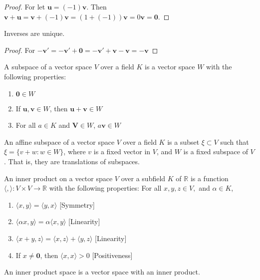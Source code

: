 \documentclass[crop=false,class=book]{standalone}
\begin{document}
\begin{proof}
For let $\mathbf{u} = (-1)\mathbf{v}$. Then $\mathbf{v}+\mathbf{u} = \mathbf{v}+(-1)\mathbf{v} = (1+(-1))\mathbf{v} = 0\mathbf{v} = \mathbf{0}$.
\end{proof}
\begin{theorem}
Inverses are unique.
\end{theorem}
\begin{proof}
For $-\mathbf{v}'=-\mathbf{v}'+\mathbf{0}=-\mathbf{v}'+\mathbf{v}-\mathbf{v}=- \mathbf{v}$
\end{proof}
\begin{definition}
A subspace of a vector space $V$ over a field $K$ is a vector space $W$ with the following properties:
\begin{enumerate}
    \item $\mathbf{0} \in W$
    \item If $\mathbf{u,v}\in W$, then $\mathbf{u}+\mathbf{v} \in W$
    \item For all $a\in K$ and $\mathbf{V} \in W$, $a\mathbf{v} \in W$
\end{enumerate}
\end{definition}
\begin{definition}
An affine subspace of a vector space $V$ over a field $K$ is a subset $\xi\subset V$ such that $\xi = \{v+w:w\in W\}$, where $v$ is a fixed vector in $V$, and $W$ is a fixed subspace of $V$. That is, they are translations of subspaces.
\end{definition}
\begin{definition}
An inner product on a vector space $V$ over a subfield $K$ of $\mathbb{R}$ is a function $\langle , \rangle:V\times V\rightarrow \mathbb{R}$ with the following properties: For all $x,y,z \in V,$ and $\alpha \in K$,
\begin{enumerate}
    \item $\langle x,y \rangle = \langle y,x \rangle$ \hfill [Symmetry]
    \item $\langle \alpha x, y \rangle = \alpha \langle x,y \rangle$ \hfill [Linearity]
    \item $\langle x+y,z \rangle = \langle x,z\rangle + \langle y,z \rangle$ \hfill [Linearity]
    \item  If $x\ne \mathbf{0}$, then $\langle x,x\rangle >0$ \hfill [Positiveness]
\end{enumerate}
\end{definition}
\begin{definition}
An inner product space is a vector space with an inner product.
\end{definition}
\end{document}
